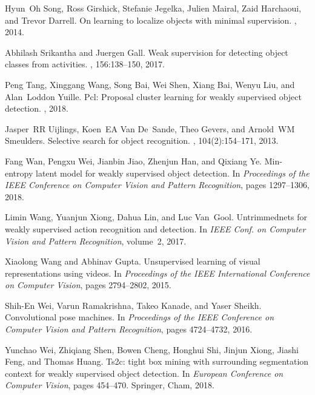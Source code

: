 \documentclass[10pt,twocolumn,letterpaper]{article}
\begin{document}
{\begin{thebibliography}{10}
Hyun~Oh Song, Ross Girshick, Stefanie Jegelka, Julien Mairal, Zaid Harchaoui,
  and Trevor Darrell.
\newblock On learning to localize objects with minimal supervision.
, 2014.

Abhilash Srikantha and Juergen Gall.
\newblock Weak supervision for detecting object classes from activities.
, 156:138--150, 2017.

Peng Tang, Xinggang Wang, Song Bai, Wei Shen, Xiang Bai, Wenyu Liu, and
  Alan~Loddon Yuille.
\newblock Pcl: Proposal cluster learning for weakly supervised object
  detection.
,
  2018.

Jasper~RR Uijlings, Koen~EA Van De~Sande, Theo Gevers, and Arnold~WM Smeulders.
\newblock Selective search for object recognition.
, 104(2):154--171,
  2013.

Fang Wan, Pengxu Wei, Jianbin Jiao, Zhenjun Han, and Qixiang Ye.
\newblock Min-entropy latent model for weakly supervised object detection.
\newblock In {\em Proceedings of the IEEE Conference on Computer Vision and
  Pattern Recognition}, pages 1297--1306, 2018.

Limin Wang, Yuanjun Xiong, Dahua Lin, and Luc Van~Gool.
\newblock Untrimmednets for weakly supervised action recognition and detection.
\newblock In {\em IEEE Conf. on Computer Vision and Pattern Recognition},
  volume~2, 2017.

Xiaolong Wang and Abhinav Gupta.
\newblock Unsupervised learning of visual representations using videos.
\newblock In {\em Proceedings of the IEEE International Conference on Computer
  Vision}, pages 2794--2802, 2015.

Shih-En Wei, Varun Ramakrishna, Takeo Kanade, and Yaser Sheikh.
\newblock Convolutional pose machines.
\newblock In {\em Proceedings of the IEEE Conference on Computer Vision and
  Pattern Recognition}, pages 4724--4732, 2016.

Yunchao Wei, Zhiqiang Shen, Bowen Cheng, Honghui Shi, Jinjun Xiong, Jiashi
  Feng, and Thomas Huang.
\newblock Ts2c: tight box mining with surrounding segmentation context for
  weakly supervised object detection.
\newblock In {\em European Conference on Computer Vision}, pages 454--470.
  Springer, Cham, 2018.


\end{thebibliography}}
\end{document}
